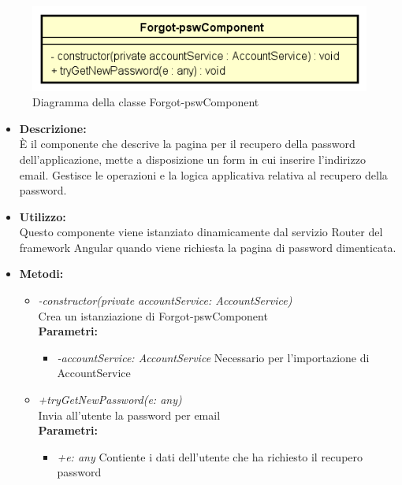 \begin{figure}[h!]
	\centering
	\includegraphics[scale=0.8]{res/sections/SpecificaFrontEnd/Components/Disegnetti/forgot-psw.png}
	\caption{Diagramma della classe Forgot-pswComponent}
\end{figure}

\begin{itemize}
	\item \textbf{Descrizione:}\\
	È il componente che descrive la pagina per il recupero della password dell'applicazione, mette a disposizione un form in cui inserire l'indirizzo email. Gestisce le operazioni e la logica applicativa relativa al recupero della password.
	\item \textbf{Utilizzo:}\\
	Questo componente viene istanziato dinamicamente dal servizio Router del framework Angular quando viene richiesta la pagina di password dimenticata.
	\item \textbf{Metodi:}
		\begin{itemize}
			\item \emph{-constructor(private accountService: AccountService)}\\
    	Crea un istanziazione di Forgot-pswComponent\\
    	\textbf{Parametri:}
    		\begin{itemize}
    			\item \emph{-accountService: AccountService}
    			Necessario per l'importazione di AccountService
    		\end{itemize}
    		\item \emph{+tryGetNewPassword(e: any)}\\
    		Invia all'utente la password per email\\
    		\textbf{Parametri:}
    		\begin{itemize}
    			\item \emph{+e: any}
    			Contiente i dati dell'utente che ha richiesto il recupero password
    		\end{itemize}
		\end{itemize}
\end{itemize}